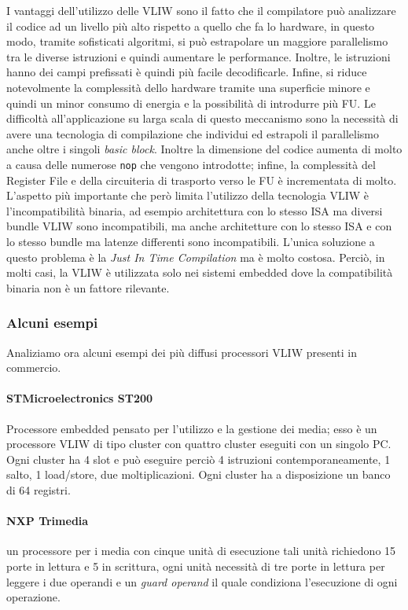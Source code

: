 I vantaggi dell'utilizzo delle VLIW sono il fatto che il compilatore può analizzare il codice ad un livello più alto rispetto a quello che fa lo hardware, in questo modo, tramite sofisticati algoritmi, si può estrapolare un maggiore parallelismo tra le diverse istruzioni e quindi aumentare le performance. Inoltre, le istruzioni hanno dei campi prefissati è quindi più facile decodificarle. Infine, si riduce notevolmente la complessità dello hardware tramite una superficie minore e quindi un minor consumo di energia e la possibilità di introdurre più FU. Le difficoltà all'applicazione su larga scala di questo meccanismo sono la necessità di avere una tecnologia di compilazione che individui ed estrapoli il parallelismo anche oltre i singoli \emph{basic block}. Inoltre la dimensione del codice aumenta di molto a causa delle numerose \texttt{nop} che vengono introdotte; infine, la complessità del Register File e della circuiteria di trasporto verso le FU è incrementata di molto. L'aspetto più importante che però limita l'utilizzo della tecnologia VLIW è l'incompatibilità binaria, ad esempio architettura con lo stesso ISA ma diversi bundle VLIW sono incompatibili, ma anche architetture con lo stesso ISA e con lo stesso bundle ma latenze differenti sono incompatibili. L'unica soluzione a questo problema è la \emph{Just In Time Compilation} ma è molto costosa. Perciò, in molti casi, la VLIW è utilizzata solo nei sistemi embedded dove la compatibilità binaria non è un fattore rilevante.
\subsubsection{Alcuni esempi}
Analiziamo ora alcuni esempi dei più diffusi processori VLIW presenti in commercio.
\paragraph{STMicroelectronics ST200}
Processore embedded pensato per l'utilizzo e la gestione dei media; esso è un processore VLIW di tipo cluster con quattro cluster eseguiti con un singolo PC. Ogni cluster ha 4 slot e può eseguire perciò 4 istruzioni contemporaneamente, 1 salto, 1 load/store, due moltiplicazioni. Ogni cluster ha a disposizione un banco di 64 registri.
\paragraph{NXP Trimedia}
 un processore per i media con cinque unità di esecuzione tali unità richiedono 15 porte in lettura e 5 in scrittura, ogni unità necessità di tre porte in lettura per leggere i due operandi e un \emph{guard operand} il quale condiziona l'esecuzione di ogni operazione.
